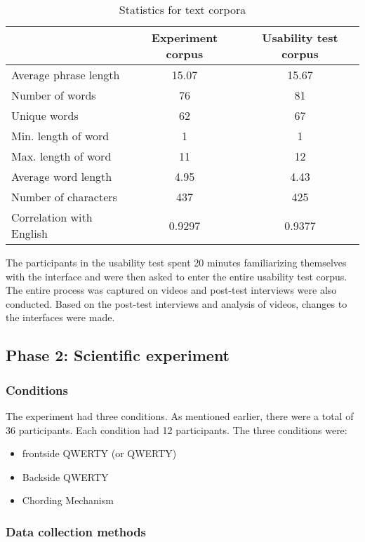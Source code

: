 \begin{table*}
	\centering
		\begin{tabular}{|l|c|c|} \hline
		                         & Experiment corpus & Usability test corpus \\ \hline
			 Average phrase length & 15.07 & 15.67 \\ \hline
			 Number of words & 76 & 81 \\ \hline
			 Unique words & 62 & 67 \\ \hline
			 Min. length of word & 1 & 1 \\ \hline
			 Max. length of word & 11 & 12 \\ \hline
			 Average word length & 4.95 & 4.43 \\ \hline
			 Number of characters & 437 & 425 \\ \hline
			 Correlation with English & 0.9297 & 0.9377 \\ \hline
		\end{tabular}
	\caption{Statistics for text corpora}
	\label{tab:StatisticsForTextCorpora}
\end{table*}

The participants in the usability test spent 20 minutes familiarizing
themselves with the interface and were then asked to enter the entire
usability test corpus. The entire process was captured on videos and
post-test interviews were also conducted. Based on the post-test
interviews and analysis of videos, changes to the interfaces were
made.

\subsection{Phase 2: Scientific experiment}
\subsubsection{Conditions}

The experiment had three conditions. As mentioned earlier, there were
a total of 36 participants. Each condition had 12 participants. The
three conditions were:

\begin{itemize}
	\item frontside QWERTY (or QWERTY)
	\item Backside QWERTY
	\item Chording Mechanism
\end{itemize}
\subsubsection{Data collection methods}

